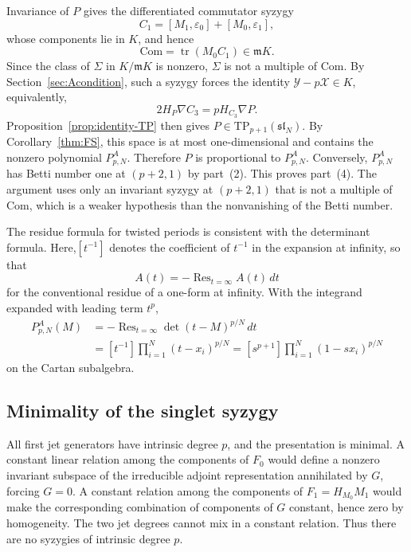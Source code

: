 \documentclass[10pt,reqno]{amsart}
\numberwithin{equation}{section}
\theoremstyle{plain}
\theoremstyle{definition}
\DeclareMathOperator{\tr}{tr}
\DeclareMathOperator{\Res}{Res}
\newcommand{\TP}{\mathrm{TP}}
\begin{document}
Invariance of $P$ gives the differentiated commutator syzygy
\begin{equation*}
	C_1=[M_1,\varepsilon_0]+[M_0,\varepsilon_1],
\end{equation*}
whose components lie in $K$, and hence
\begin{equation*}
	\mathrm{Com}=\tr(M_0C_1)\in\mathfrak mK.
\end{equation*}
Since the class of $\Sigma$ in $K/\mathfrak mK$ is nonzero, $\Sigma$ is not a multiple of $\mathrm{Com}$. By Section~\ref{sec:Acondition}, such a syzygy forces the identity $\mathcal Y-p\mathcal X\in K$, equivalently,
\begin{equation*}
	2H_P\nabla C_3=pH_{C_3}\nabla P.
\end{equation*}
Proposition~\ref{prop:identity-TP} then gives $P\in\TP_{p+1}(\mathfrak{sl}_N)$. By Corollary~\ref{thm:FS}, this space is at most one-dimensional and contains the nonzero polynomial $P^A_{p,N}$. Therefore $P$ is proportional to $P^A_{p,N}$. Conversely, $P^A_{p,N}$ has Betti number one at $(p+2,1)$ by part~(2). This proves part~(4). The argument uses only an invariant syzygy at $(p+2,1)$ that is not a multiple of $\mathrm{Com}$, which is a weaker hypothesis than the nonvanishing of the Betti number.

The residue formula for twisted periods \cite{DubrovinAlmost,FS} is consistent with the determinant formula. Here,$[t^{-1}]$ denotes the coefficient of $t^{-1}$ in the expansion at infinity, so that 
\begin{equation*}
    [t^{-1}]A(t)=-\Res_{t=\infty}A(t)\,dt
\end{equation*}
for the conventional residue of a one-form at infinity. With the integrand expanded with leading term $t^p$,
\begin{equation}\label{eq:Aresidue}
\begin{split}
	P^A_{p,N}(M)&=-\Res_{t=\infty}\det(t-M)^{p/N}\,dt\\
	&=[t^{-1}]\prod_{i=1}^N(t-x_i)^{p/N}=[s^{p+1}]\prod_{i=1}^N(1-sx_i)^{p/N}
\end{split}
\end{equation}
on the Cartan subalgebra.

\subsection{Minimality of the singlet syzygy}\label{sec:Amin}

All first jet generators have intrinsic degree $p$, and the presentation is minimal. A constant linear relation among the components of $F_0$ would define a nonzero invariant subspace of the irreducible adjoint representation annihilated by $G$, forcing $G=0$. A constant relation among the components of $F_1=H_{M_0}M_1$ would make the corresponding combination of components of $G$ constant, hence zero by homogeneity. The two jet degrees cannot mix in a constant relation. Thus there are no syzygies of intrinsic degree $p$.
\end{document}
